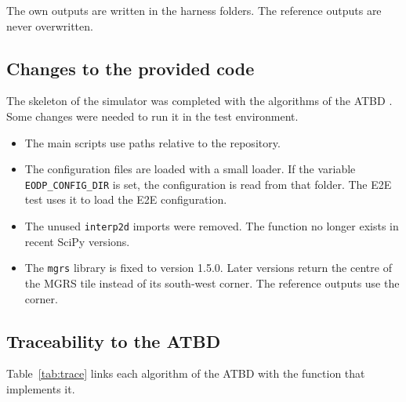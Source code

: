 The own outputs are written in the harness folders.
The reference outputs are never overwritten.

\subsection{Changes to the provided code}
The skeleton of the simulator was completed with the algorithms of the ATBD \cite{atbd}.
Some changes were needed to run it in the test environment.

\begin{itemize}
\item The main scripts use paths relative to the repository.
\item The configuration files are loaded with a small loader. If the variable \texttt{EODP\_CONFIG\_DIR} is set, the configuration is read from that folder. The E2E test uses it to load the E2E configuration.
\item The unused \texttt{interp2d} imports were removed. The function no longer exists in recent SciPy versions.
\item The \texttt{mgrs} library is fixed to version 1.5.0. Later versions return the centre of the MGRS tile instead of its south-west corner. The reference outputs use the corner.

\end{itemize}

\subsection{Traceability to the ATBD}
Table~\ref{tab:trace} links each algorithm of the ATBD \cite{atbd} with the function that implements it.

